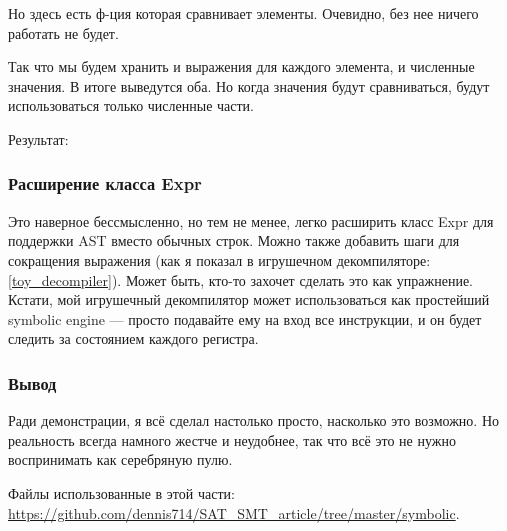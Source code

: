 Но здесь есть ф-ция которая сравнивает элементы.
Очевидно, без нее ничего работать не будет.

Так что мы будем хранить и выражения для каждого элемента, и численные значения.
В итоге выведутся оба.
Но когда значения будут сравниваться, будут использоваться только численные части.

Результат:



\subsubsection{Расширение класса Expr}

Это наверное бессмысленно, но тем не менее, легко расширить класс Expr для поддержки \ac{AST} вместо обычных строк.
Можно также добавить шаги для сокращения выражения (как я показал в игрушечном декомпиляторе: \ref{toy_decompiler}).
Может быть, кто-то захочет сделать это как упражнение.
Кстати, мой игрушечный декомпилятор может использоваться как простейший symbolic engine --- просто подавайте ему на вход
все инструкции, и он будет следить за состоянием каждого регистра.

\subsubsection{Вывод}

Ради демонстрации, я всё сделал настолько просто, насколько это возможно.
Но реальность всегда намного жестче и неудобнее, так что всё это не нужно воспринимать как серебряную пулю.

Файлы использованные в этой части: \url{https://github.com/dennis714/SAT_SMT_article/tree/master/symbolic}.

